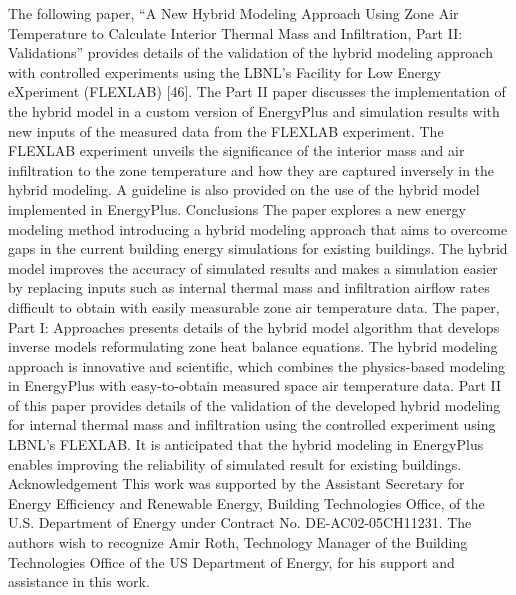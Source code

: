 The following paper, “A New Hybrid Modeling Approach Using Zone Air Temperature to Calculate Interior Thermal Mass and Infiltration, Part II: Validations” provides details of the validation of the hybrid modeling approach with controlled experiments using the LBNL's  Facility for Low Energy eXperiment (FLEXLAB) [46]. The Part II paper discusses the implementation of the hybrid model in a custom version of EnergyPlus and simulation results with new inputs of the measured data from the FLEXLAB experiment. The FLEXLAB experiment unveils the significance of the interior mass and air infiltration to the zone temperature and how they are captured inversely in the hybrid modeling. A guideline is also provided on the use of the hybrid model implemented in EnergyPlus.
Conclusions
The paper explores a new energy modeling method introducing a hybrid modeling approach that aims to overcome gaps in the current building energy simulations for existing buildings. The hybrid model improves the accuracy of simulated results and makes a simulation easier by replacing inputs such as internal thermal mass and infiltration airflow rates difficult to obtain with easily measurable zone air temperature data. The paper, Part I: Approaches presents details of the hybrid model algorithm that develops inverse models reformulating zone heat balance equations. The hybrid modeling approach is innovative and scientific, which combines the physics-based modeling in EnergyPlus with easy-to-obtain measured space air temperature data. Part II of this paper provides details of the validation of the developed hybrid modeling for internal thermal mass and infiltration using the controlled experiment using LBNL’s FLEXLAB. It is anticipated that the hybrid modeling in EnergyPlus enables improving the reliability of simulated result for existing buildings.
Acknowledgement 
This work was supported by the Assistant Secretary for Energy Efficiency and Renewable Energy, Building Technologies Office, of the U.S. Department of Energy under Contract No. DE-AC02-05CH11231. The authors wish to recognize Amir Roth, Technology Manager of the Building Technologies Office of the US Department of Energy, for his support and assistance in this work.

